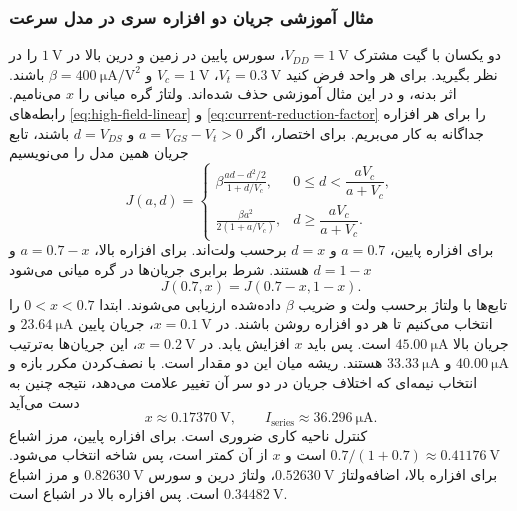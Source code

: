 \subsubsection*{مثال آموزشی جریان دو افزاره سری در مدل سرعت}
\label{sec:series-velocity-example}
دو  یکسان با گیت مشترک \(V_{DD}=\qty{1}{\volt}\)،
سورس پایین در زمین و درین بالا در \(\qty{1}{\volt}\) را در نظر
بگیرید. برای هر واحد فرض کنید
\(V_t=\qty{0.3}{\volt}\)، \(V_c=\qty{1}{\volt}\) و
\(\beta=\qty{400}{\micro\ampere\per\volt\squared}\) باشند.
اثر بدنه،  و  در این مثال آموزشی حذف شده‌اند.
ولتاژ گره میانی را \(x\) می‌نامیم.
رابطه‌های \eqref{eq:high-field-linear} و
\eqref{eq:current-reduction-factor} را برای هر افزاره جداگانه به
کار می‌بریم. برای اختصار، اگر \(a=V_{GS}-V_t>0\) و \(d=V_{DS}\)
باشند، تابع جریان همین مدل را می‌نویسیم
\begin{equation}
 J(a,d)=
 \begin{cases}
 \displaystyle\beta\frac{ad-d^2/2}{1+d/V_c},
       &0\le d<\dfrac{aV_c}{a+V_c},\\[6pt]
 \displaystyle\frac{\beta a^2}{2(1+a/V_c)},
       &d\ge\dfrac{aV_c}{a+V_c}.
 \end{cases}
 \label{eq:series-velocity-function}
\end{equation}
برای افزاره پایین، \(a=0.7\) و \(d=x\) برحسب ولت‌اند.
برای افزاره بالا، \(a=0.7-x\) و \(d=1-x\) هستند. شرط برابری
جریان‌ها در گره میانی می‌شود
\begin{equation*}
 J(0.7,x)=J(0.7-x,1-x).
\end{equation*}
تابع‌ها با ولتاژ برحسب ولت و ضریب \(\beta\) داده‌شده ارزیابی
می‌شوند. ابتدا \(0<x<0.7\) را انتخاب می‌کنیم تا هر دو افزاره
روشن باشند. در \(x=\qty{0.1}{\volt}\)، جریان پایین
\(\qty{23.64}{\micro\ampere}\) و جریان بالا
\(\qty{45.00}{\micro\ampere}\) است. پس باید \(x\) افزایش یابد.
در \(x=\qty{0.2}{\volt}\)، این جریان‌ها به‌ترتیب
\(\qty{40.00}{\micro\ampere}\) و
\(\qty{33.33}{\micro\ampere}\) هستند. ریشه میان این دو مقدار است.
با نصف‌کردن مکرر بازه و انتخاب نیمه‌ای که اختلاف جریان در دو سر
آن تغییر علامت می‌دهد، نتیجه چنین به دست می‌آید
\begin{equation*}
 x\approx\qty{0.17370}{\volt},\qquad
 I_{\mathrm{series}}\approx\qty{36.296}{\micro\ampere}.
\end{equation*}
کنترل ناحیه کاری ضروری است. برای افزاره پایین، مرز اشباع
\(0.7/(1+0.7)\approx\qty{0.41176}{\volt}\) است و
\(x\) از آن کمتر است، پس شاخه  انتخاب می‌شود.
برای افزاره بالا، اضافه‌ولتاژ
\(\qty{0.52630}{\volt}\)، ولتاژ درین و سورس
\(\qty{0.82630}{\volt}\) و مرز اشباع
\(\qty{0.34482}{\volt}\) است. پس افزاره بالا در اشباع است.

